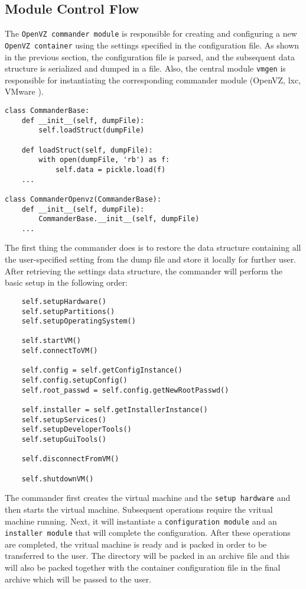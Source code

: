 \subsection{Module Control Flow} \label{sec:openvz-flow}
The \texttt{OpenVZ commander module} is responsible for creating 
and configuring a new \texttt{OpenVZ container} using the settings 
specified in the configuration file. As shown in the previous section, the 
configuration file is parsed, and the subsequent data structure is serialized 
and dumped in a file. Also, the central module \texttt{vmgen} is responsible 
for instantiating the corresponding commander module (OpenVZ, lxc, 
VMware ).
\\
\lstset{language=Python,caption=Retrieve settings from the dump file,
label=lst:load-dump-file-2}
\begin{lstlisting}
class CommanderBase:
	def __init__(self, dumpFile):
		self.loadStruct(dumpFile)

	def loadStruct(self, dumpFile):
		with open(dumpFile, 'rb') as f:
			self.data = pickle.load(f)
	...

class CommanderOpenvz(CommanderBase):
	def __init__(self, dumpFile):
		CommanderBase.__init__(self, dumpFile)
	...
\end{lstlisting}

The first thing the commander does is to restore the data 
structure containing all the user-specified setting from the dump file and 
store it locally for further user. After retrieving the settings data structure, 
the commander will perform the basic setup in the following order:
\\
\lstset{language=Python,caption=Operations performed by the 
commander module,
label=lst:setup-order}
\begin{lstlisting}
	self.setupHardware()
	self.setupPartitions()
	self.setupOperatingSystem()

	self.startVM()
	self.connectToVM()

	self.config = self.getConfigInstance()
	self.config.setupConfig()
	self.root_passwd = self.config.getNewRootPasswd()

	self.installer = self.getInstallerInstance()
	self.setupServices()
	self.setupDeveloperTools()
	self.setupGuiTools()

	self.disconnectFromVM()

	self.shutdownVM()
\end{lstlisting}

The commander first creates the virtual machine and the \texttt{setup 
hardware} and then starts the virtual machine. Subsequent operations 
require the vritual machine running. Next, it will instantiate a 
\texttt{configuration module} and an \texttt{installer module} that will 
complete the configuration. After these operations are completed, the 
vritual machine is ready and is packed in order to be transferred to the user. 
The directory will be packed in an archive file and this will also be packed 
together with the container configuration file in the final archive which 
will be passed to the user.

